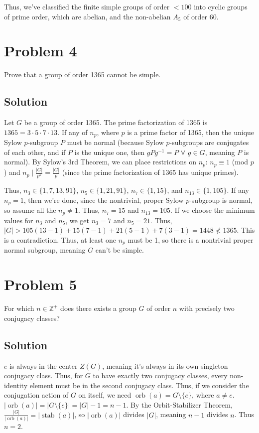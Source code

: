 \documentclass[fleqn]{article}
\DeclareMathOperator{\orb}{orb}
\DeclareMathOperator{\stab}{stab}
\begin{document}
        Thus, we've classified the finite simple groups of order $< 100$ into cyclic groups of prime order, which are abelian, and the non-abelian $A_5$ of order 60.
    
    \section{Problem 4}
    Prove that a group of order 1365 cannot be simple.
        
        \subsection{Solution}
        Let $G$ be a group of order 1365.  The prime factorization of 1365 is $1365 = 3 \cdot  5\cdot 7 \cdot 13$.  If any of $n_p$, where $p$ is a prime factor of 1365, then the unique Sylow $p$-subgroup $P$ must be normal (because Sylow $p$-subgroups are conjugates of each other, and if $P$ is the unique one, then $gPg^{-1} = P$ $\forall$ $g \in G$, meaning $P$ is normal).  By Sylow's 3rd Theorem, we can place restrictions on $n_p$: $n_p \equiv 1$ (mod $p$) and $n_p \mid \frac{|G|}{p^k} = \frac{|G|}{p}$ (since the prime factorization of 1365 has unique primes).
        
        Thus, $n_3 \in \{1, 7, 13, 91\}$, $n_5 \in \{1, 21, 91\}$, $n_7 \in \{1, 15\}$, and $n_{13} \in \{1, 105\}$.  If any $n_p = 1$, then we're done, since the nontrivial, proper Sylow $p$-subgroup is normal, so assume all the $n_p \neq 1$.  Thus, $n_7 = 15$ and $n_{13} = 105$.  If we choose the minimum values for $n_3$ and $n_5$, we get $n_3 = 7$ and $n_5 = 21$.  Thus, $|G| > 105(13 - 1) + 15(7 - 1) + 21(5 - 1) + 7(3 - 1) = 1448 \not< 1365$.  This is a contradiction.  Thus, at least one $n_p$ must be 1, so there is a nontrivial proper normal subgroup, meaning $G$ can't be simple.
    
    \section{Problem 5}
    For which $n \in \mathbb{Z}^+$ does there exists a group $G$ of order $n$ with precisely two conjugacy classes?
        
        \subsection{Solution}
        $e$ is always in the center $Z(G)$, meaning it's always in its own singleton conjugacy class.  Thus, for $G$ to have exactly two conjugacy classes, every non-identity element must be in the second conjugacy class.  Thus, if we consider the conjugation action of $G$ on itself, we need $\orb(a) = G \setminus \{e\}$, where $a \neq e$.  $|\orb(a)| = |G \setminus \{e\}| = |G| - 1 = n - 1$.  By the Orbit-Stabilizer Theorem, $\frac{|G|}{|\orb(a)|} = |\stab(a)|$, so $|\orb(a)|$ divides $|G|$, meaning $n - 1$ divides $n$.  Thus $n = 2$.
    
\end{document}

